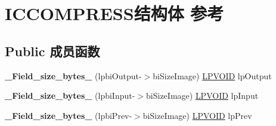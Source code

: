 \hypertarget{struct_i_c_c_o_m_p_r_e_s_s}{}\section{I\+C\+C\+O\+M\+P\+R\+E\+S\+S结构体 参考}
\label{struct_i_c_c_o_m_p_r_e_s_s}
\subsection*{Public 成员函数}
\begin{DoxyCompactItemize}
\item 
\mbox{\label{struct_i_c_c_o_m_p_r_e_s_s_abb301119a8768fce6d0128fb13849eaf}} 
{\bfseries \+\_\+\+Field\+\_\+size\+\_\+bytes\+\_\+} (lpbi\+Output-\/$>$bi\+Size\+Image) \hyperlink{interfacevoid}{L\+P\+V\+O\+ID} lp\+Output
\item 
\mbox{\label{struct_i_c_c_o_m_p_r_e_s_s_ad47801928c3901fd51339722467cd407}} 
{\bfseries \+\_\+\+Field\+\_\+size\+\_\+bytes\+\_\+} (lpbi\+Input-\/$>$bi\+Size\+Image) \hyperlink{interfacevoid}{L\+P\+V\+O\+ID} lp\+Input
\item 
\mbox{\label{struct_i_c_c_o_m_p_r_e_s_s_aa7f7c9e603b17b65c4f517c50f658164}} 
{\bfseries \+\_\+\+Field\+\_\+size\+\_\+bytes\+\_\+} (lpbi\+Prev-\/$>$bi\+Size\+Image) \hyperlink{interfacevoid}{L\+P\+V\+O\+ID} lp\+Prev
\end{DoxyCompactItemize}
